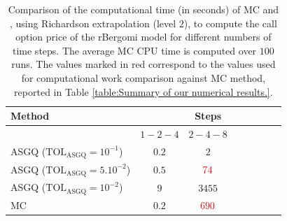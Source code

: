 \begin{table}[!h]
	\centering
	\begin{tabular}{l*{6}{c}r}
		\toprule[1.5pt]
	Method & & Steps  & &     \\
	\hline
		           & $1-2-4$ & $2-4-8$   \\
		\hline

		ASGQ ($\text{TOL}_{\text{ASGQ}}=10^{-1}$)  & $0.2$ & $2$ &   \\
		ASGQ ($\text{TOL}_{\text{ASGQ}}=5.10^{-2}$)  & $0.5$ & ${\color{red}74}$  \\
		ASGQ ($\text{TOL}_{\text{ASGQ}}=10^{-2}$)  & $9$ & $3455$   \\
%		
		\hline
		MC    & $ 0.2$  & ${\color{red}690}$  \\
		
		\bottomrule[1.25pt]
	\end{tabular}
	\caption{Comparison of the computational time (in seconds) of  MC and , using Richardson extrapolation (level $2$), to compute the call option price of the rBergomi model for different numbers of time steps. The 	average MC CPU time is computed over $100$ runs. The values marked in red correspond to the values used for computational work comparison against MC method, reported in Table \ref{table:Summary of our numerical results.}.}
	\label{Comparsion of the computational time of  MC and MISC, using Richardson extrapolation (level $2$), used to compute Call option price of rBergomi model for different number of time steps. Case set $2$ parameters,linear}
\end{table}

\FloatBarrier

